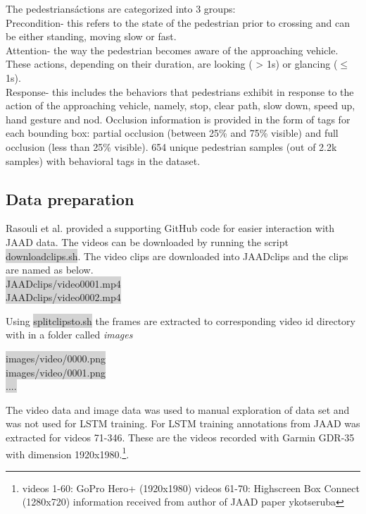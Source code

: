 The pedestrians\' actions are categorized into 3 groups: \\
Precondition- this refers to the state of the pedestrian prior to crossing and can be either standing, moving slow or fast. \\
Attention- the way the pedestrian becomes aware of the approaching vehicle. These actions, depending on their duration, are looking ( > 1s) or glancing ($\leq$ 1s). \\
Response- this includes the behaviors that pedestrians exhibit in response
to the action of the approaching vehicle, namely, stop, clear path, slow down, speed up, hand gesture and nod.
Occlusion information is provided in the form of tags for each bounding box: partial occlusion (between 25\% and 75\% visible) and full occlusion (less than 25\% visible).  654 unique pedestrian samples (out of 2.2k samples) with behavioral tags in the dataset. 

\subsection{Data preparation}
\cite{rasouli2017agreeing} Rasouli et al. provided a supporting GitHub code for easier interaction with JAAD data. The videos can be downloaded by running the script \colorbox{lightgray}{download\textunderscore clips.sh}. The video clips are downloaded into JAAD\textunderscore clips and the clips are named as below.\\
\colorbox{lightgray} {JAAD\textunderscore clips/video\textunderscore  0001.mp4} \\
\colorbox{lightgray} {JAAD\textunderscore clips/video\textunderscore  0002.mp4}

Using \colorbox{lightgray}{split\textunderscore clips\textunderscore to\textunderscore .sh} the frames are extracted to corresponding video id directory with in a folder called \textit{images} \\
\begin{center}
\colorbox{lightgray} {images/video/0000.png} \\
\colorbox{lightgray} {images/video/0001.png} \\
\colorbox{lightgray} {....}
\end{center}

The video data and image data was used to manual exploration of data set and was not used for LSTM training. For LSTM training annotations from JAAD was extracted for videos 71-346. These are the videos recorded with Garmin GDR-35 with dimension 1920x1980.\footnote{videos 1-60: GoPro Hero+ (1920x1980)
videos 61-70: Highscreen Box Connect (1280x720) information received from author of JAAD paper ykotseruba}. \\

